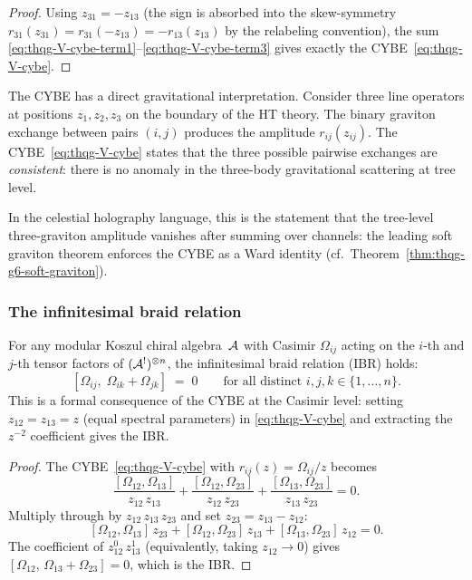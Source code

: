 \begin{proof}
Using $z_{31} = -z_{13}$ (the sign is absorbed into the skew-symmetry
$r_{31}(z_{31}) = r_{31}(-z_{13}) = -r_{13}(z_{13})$
by the relabeling convention), the sum
\eqref{eq:thqg-V-cybe-term1}--\eqref{eq:thqg-V-cybe-term3}
gives exactly the CYBE~\eqref{eq:thqg-V-cybe}.
\end{proof}

\begin{remark}
\label{rem:thqg-V-cybe-gravitational}
The CYBE has a direct gravitational interpretation.
Consider three line operators at positions $z_1, z_2, z_3$ on the
boundary of the HT theory. The binary graviton exchange between
pairs $(i,j)$ produces the amplitude $r_{ij}(z_{ij})$. The
CYBE~\eqref{eq:thqg-V-cybe} states that the three possible pairwise
exchanges are \emph{consistent}: there is no anomaly in the three-body
gravitational scattering at tree level.

In the celestial holography language, this is the statement that the
tree-level three-graviton amplitude vanishes after summing over
channels: the leading soft graviton theorem enforces the CYBE as
a Ward identity (cf.~Theorem~\ref{thm:thqg-g6-soft-graviton}).
\end{remark}


\subsubsection{The infinitesimal braid relation}

\begin{corollary}
\label{cor:thqg-V-ibr}
For any modular Koszul chiral algebra~$\mathcal{A}$ with Casimir
$\Omega_{ij}$ acting on the $i$-th and $j$-th tensor factors of
$(\mathcal{A}^!)^{\otimes n}$, the infinitesimal braid relation
\textup{(}IBR\textup{)} holds:
\begin{equation}\label{eq:thqg-V-ibr}
[\Omega_{ij},\;\Omega_{ik} + \Omega_{jk}] \;=\; 0
\qquad
\text{for all distinct } i,j,k \in \{1,\dotsc,n\}.
\end{equation}
This is a formal consequence of the CYBE at the Casimir level:
setting $z_{12} = z_{13} = z$ (equal spectral parameters) in
\eqref{eq:thqg-V-cybe} and extracting the $z^{-2}$ coefficient
gives the IBR\@.
\end{corollary}

\begin{proof}
The CYBE~\eqref{eq:thqg-V-cybe} with
$r_{ij}(z) = \Omega_{ij}/z$ becomes
\[
\frac{[\Omega_{12},\Omega_{13}]}{z_{12}\,z_{13}}
+
\frac{[\Omega_{12},\Omega_{23}]}{z_{12}\,z_{23}}
+
\frac{[\Omega_{13},\Omega_{23}]}{z_{13}\,z_{23}}
= 0.
\]
Multiply through by $z_{12}\,z_{13}\,z_{23}$ and set
$z_{23} = z_{13} - z_{12}$:
\[
[\Omega_{12},\Omega_{13}]\,z_{23}
+ [\Omega_{12},\Omega_{23}]\,z_{13}
+ [\Omega_{13},\Omega_{23}]\,z_{12}
= 0.
\]
The coefficient of $z_{12}^0\,z_{13}^1$ (equivalently,
taking $z_{12} \to 0$) gives
$[\Omega_{12},\,\Omega_{13} + \Omega_{23}] = 0$,
which is the IBR\@.
\end{proof}

